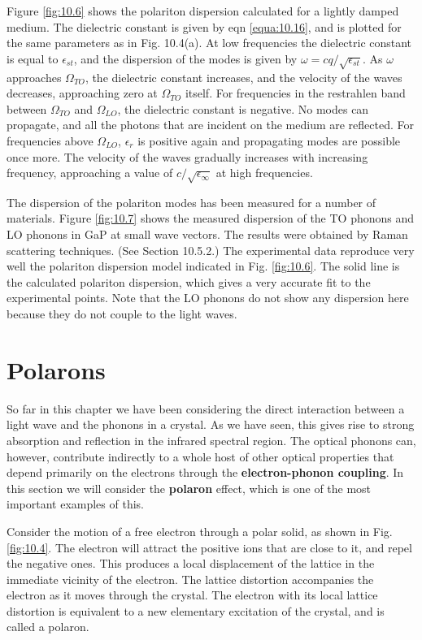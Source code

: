 \documentclass[12pt]{book}
\begin{document}
{Figure \ref{fig:10.6} shows the polariton dispersion calculated for a lightly damped medium. The dielectric constant is given by eqn \ref{equa:10.16}, and is plotted for the same parameters as in Fig. 10.4(a). At low frequencies the dielectric constant is equal to $\epsilon_{st}$, and the dispersion of the modes is given by $\omega=cq/\sqrt{\epsilon_{st}}$. As $\omega$ approaches $\Omega_{TO}$, the dielectric constant increases, and the velocity of the waves decreases, approaching zero at $\Omega_{TO}$ itself. For frequencies in the restrahlen band between $\Omega_{TO}$ and $\Omega_{LO}$, the dielectric constant is negative. No modes can propagate, and all the photons that are incident on the medium are reflected. For frequencies above $\Omega_{LO}$, $\epsilon_r$ is positive again and propagating modes are possible once more. The velocity of the waves gradually increases with increasing frequency, approaching a value of $c/\sqrt{\epsilon_{\infty}}$ at high frequencies.

The dispersion of the polariton modes has been measured for a number of materials. Figure \ref{fig:10.7} shows the measured dispersion of the TO phonons and LO phonons in GaP at small wave vectors. The results were obtained by Raman scattering techniques. (See Section 10.5.2.) The experimental data reproduce very well the polariton dispersion model indicated in Fig. \ref{fig:10.6}. The solid line is the calculated polariton dispersion, which gives a very accurate fit to the experimental points. Note that the LO phonons do not show any dispersion here because they do not couple to the light waves.

\section{Polarons}

So far in this chapter we have been considering the direct interaction between a light wave and the phonons in a crystal. As we have seen, this gives rise to strong absorption and reflection in the infrared spectral region. The optical phonons can, however, contribute indirectly to a whole host of other optical properties that depend primarily on the electrons through the \textbf{electron-phonon coupling}. In this section we will consider the \textbf{polaron} effect, which is one of the most important examples of this.

Consider the motion of a free electron through a polar solid, as shown in Fig. \ref{fig:10.4}. The electron will attract the positive ions that are close to it, and repel the negative ones. This produces a local displacement of the lattice in the immediate vicinity of the electron. The lattice distortion accompanies the electron as it moves through the crystal. The electron with its local lattice distortion is equivalent to a new elementary excitation of the crystal, and is called a polaron.

}
\end{document}
